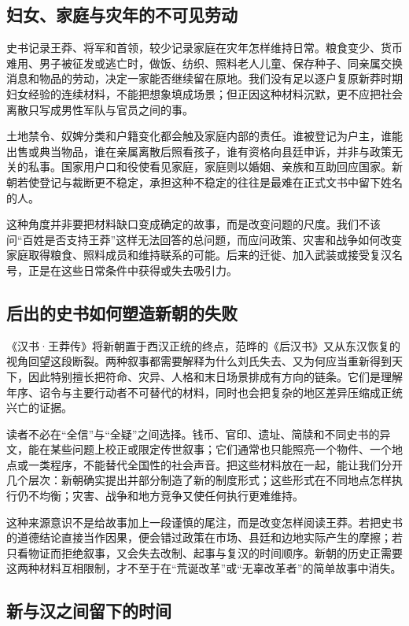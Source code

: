 \subsection{妇女、家庭与灾年的不可见劳动}

史书记录王莽、将军和首领，较少记录家庭在灾年怎样维持日常。粮食变少、货币难用、男子被征发或逃亡时，做饭、纺织、照料老人儿童、保存种子、同亲属交换消息和物品的劳动，决定一家能否继续留在原地。我们没有足以逐户复原新莽时期妇女经验的连续材料，不能把想象填成场景；但正因这种材料沉默，更不应把社会离散只写成男性军队与官员之间的事。

土地禁令、奴婢分类和户籍变化都会触及家庭内部的责任。谁被登记为户主，谁能出售或典当物品，谁在亲属离散后照看孩子，谁有资格向县廷申诉，并非与政策无关的私事。国家用户口和役使看见家庭，家庭则以婚姻、亲族和互助回应国家。新朝若使登记与裁断更不稳定，承担这种不稳定的往往是最难在正式文书中留下姓名的人。

这种角度并非要把材料缺口变成确定的故事，而是改变问题的尺度。我们不该问“百姓是否支持王莽”这样无法回答的总问题，而应问政策、灾害和战争如何改变家庭取得粮食、照料成员和维持联系的可能。后来的迁徙、加入武装或接受复汉名号，正是在这些日常条件中获得或失去吸引力。

\subsection{后出的史书如何塑造新朝的失败}

《汉书·王莽传》将新朝置于西汉正统的终点，范晔的《后汉书》又从东汉恢复的视角回望这段断裂。两种叙事都需要解释为什么刘氏失去、又为何应当重新得到天下，因此特别擅长把符命、灾异、人格和末日场景排成有方向的链条。它们是理解年序、诏令与主要行动者不可替代的材料，同时也会把复杂的地区差异压缩成正统兴亡的证据。

读者不必在“全信”与“全疑”之间选择。钱币、官印、遗址、简牍和不同史书的异文，能在某些问题上校正或限定传世叙事；它们通常也只能照亮一个物件、一个地点或一类程序，不能替代全国性的社会声音。把这些材料放在一起，能让我们分开几个层次：新朝确实提出并部分制造了新的制度形式；这些形式在不同地点怎样执行仍不均衡；灾害、战争和地方竞争又使任何执行更难维持。

这种来源意识不是给故事加上一段谨慎的尾注，而是改变怎样阅读王莽。若把史书的道德结论直接当作因果，便会错过政策在市场、县廷和边地实际产生的摩擦；若只看物证而拒绝叙事，又会失去改制、起事与复汉的时间顺序。新朝的历史正需要这两种材料互相限制，才不至于在“荒诞改革”或“无辜改革者”的简单故事中消失。

\subsection{新与汉之间留下的时间}

